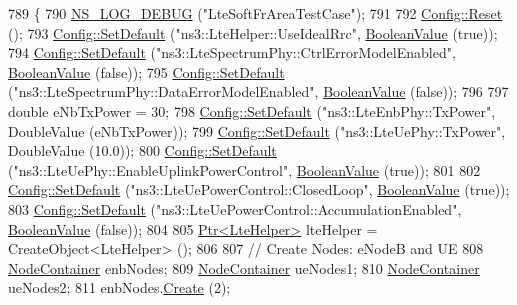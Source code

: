 \begin{DoxyCode}
789 \{
790   \hyperlink{group__logging_ga413f1886406d49f59a6a0a89b77b4d0a}{NS\_LOG\_DEBUG} (\textcolor{stringliteral}{"LteSoftFrAreaTestCase"});
791 
792   \hyperlink{group__config_ga2c1b65724f42f8c72276d7e7ad6df6db}{Config::Reset} ();
793   \hyperlink{group__config_ga2e7882df849d8ba4aaad31c934c40c06}{Config::SetDefault} (\textcolor{stringliteral}{"ns3::LteHelper::UseIdealRrc"}, 
      \hyperlink{classns3_1_1BooleanValue}{BooleanValue} (\textcolor{keyword}{true}));
794   \hyperlink{group__config_ga2e7882df849d8ba4aaad31c934c40c06}{Config::SetDefault} (\textcolor{stringliteral}{"ns3::LteSpectrumPhy::CtrlErrorModelEnabled"}, 
      \hyperlink{classns3_1_1BooleanValue}{BooleanValue} (\textcolor{keyword}{false}));
795   \hyperlink{group__config_ga2e7882df849d8ba4aaad31c934c40c06}{Config::SetDefault} (\textcolor{stringliteral}{"ns3::LteSpectrumPhy::DataErrorModelEnabled"}, 
      \hyperlink{classns3_1_1BooleanValue}{BooleanValue} (\textcolor{keyword}{false}));
796 
797   \textcolor{keywordtype}{double} eNbTxPower = 30;
798   \hyperlink{group__config_ga2e7882df849d8ba4aaad31c934c40c06}{Config::SetDefault} (\textcolor{stringliteral}{"ns3::LteEnbPhy::TxPower"}, DoubleValue (eNbTxPower));
799   \hyperlink{group__config_ga2e7882df849d8ba4aaad31c934c40c06}{Config::SetDefault} (\textcolor{stringliteral}{"ns3::LteUePhy::TxPower"}, DoubleValue (10.0));
800   \hyperlink{group__config_ga2e7882df849d8ba4aaad31c934c40c06}{Config::SetDefault} (\textcolor{stringliteral}{"ns3::LteUePhy::EnableUplinkPowerControl"}, 
      \hyperlink{classns3_1_1BooleanValue}{BooleanValue} (\textcolor{keyword}{true}));
801 
802   \hyperlink{group__config_ga2e7882df849d8ba4aaad31c934c40c06}{Config::SetDefault} (\textcolor{stringliteral}{"ns3::LteUePowerControl::ClosedLoop"}, 
      \hyperlink{classns3_1_1BooleanValue}{BooleanValue} (\textcolor{keyword}{true}));
803   \hyperlink{group__config_ga2e7882df849d8ba4aaad31c934c40c06}{Config::SetDefault} (\textcolor{stringliteral}{"ns3::LteUePowerControl::AccumulationEnabled"}, 
      \hyperlink{classns3_1_1BooleanValue}{BooleanValue} (\textcolor{keyword}{false}));
804 
805   \hyperlink{classns3_1_1Ptr}{Ptr<LteHelper>} lteHelper = CreateObject<LteHelper> ();
806 
807   \textcolor{comment}{// Create Nodes: eNodeB and UE}
808   \hyperlink{classns3_1_1NodeContainer}{NodeContainer} enbNodes;
809   \hyperlink{classns3_1_1NodeContainer}{NodeContainer} ueNodes1;
810   \hyperlink{classns3_1_1NodeContainer}{NodeContainer} ueNodes2;
811   enbNodes.\hyperlink{classns3_1_1NodeContainer_a787f059e2813e8b951cc6914d11dfe69}{Create} (2);

\end{DoxyCode}
